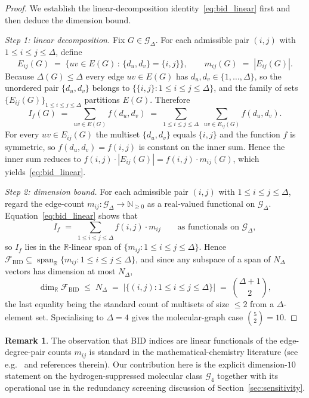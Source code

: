 \documentclass[11pt,a4paper]{article}
\theoremstyle{definition}
\newtheorem{remark}[theorem]{Remark}
\newcommand{\bid}{\mathcal{F}_{\mathrm{BID}}}
\begin{document}
\begin{proof}
We establish the linear-decomposition
identity~\eqref{eq:bid_linear} first and then deduce the dimension
bound.

\emph{Step 1: linear decomposition.} Fix $G\in\mathcal{G}_{\Delta}$.
For each admissible pair $(i,j)$ with $1\le i\le j\le\Delta$, define
\[
E_{ij}(G) \;=\; \bigl\{ uv\in E(G) \,:\, \{d_u,d_v\}=\{i,j\} \bigr\},
\qquad
m_{ij}(G) \;=\; |E_{ij}(G)|.
\]
Because $\Delta(G)\le\Delta$ every edge $uv\in E(G)$ has
$d_u,d_v\in\{1,\ldots,\Delta\}$, so the unordered pair $\{d_u,d_v\}$
belongs to $\{\{i,j\}:1\le i\le j\le\Delta\}$, and the family of sets
$\{E_{ij}(G)\}_{1\le i\le j\le\Delta}$ partitions $E(G)$. Therefore
\[
I_{f}(G) \;=\; \sum_{uv\in E(G)} f(d_u,d_v)
\;=\; \sum_{1\le i\le j\le\Delta}\;\sum_{uv\in E_{ij}(G)} f(d_u,d_v).
\]
For every $uv\in E_{ij}(G)$ the multiset $\{d_u,d_v\}$ equals
$\{i,j\}$ and the function $f$ is symmetric, so $f(d_u,d_v)=f(i,j)$
is constant on the inner sum. Hence the inner sum reduces to
$f(i,j)\cdot |E_{ij}(G)| = f(i,j)\cdot m_{ij}(G)$, which
yields~\eqref{eq:bid_linear}.

\emph{Step 2: dimension bound.} For each admissible pair $(i, j)$
with $1\le i\le j\le\Delta$, regard the edge-count
$m_{ij}:\mathcal{G}_{\Delta}\to\mathbb{N}_{\ge 0}$ as a real-valued
functional on $\mathcal{G}_{\Delta}$. Equation~\eqref{eq:bid_linear}
shows that
\[
I_{f} \;=\; \sum_{1\le i\le j\le\Delta} f(i,j)\cdot m_{ij}
\qquad\text{as functionals on }\mathcal{G}_{\Delta},
\]
so $I_{f}$ lies in the $\mathbb{R}$-linear span of
$\{m_{ij} : 1\le i\le j\le\Delta\}$. Hence
$\bid \subseteq \operatorname{span}_{\mathbb{R}}\{m_{ij}:1\le i\le j\le\Delta\}$,
and since any subspace of a span of $N_{\Delta}$ vectors has
dimension at most $N_{\Delta}$,
\[
\dim_{\mathbb{R}} \bid \;\le\; N_{\Delta}
\;=\; |\{(i,j) : 1\le i\le j\le\Delta\}|
\;=\; \binom{\Delta+1}{2},
\]
the last equality being the standard count of multisets of size
$\le 2$ from a $\Delta$-element set. Specialising to $\Delta = 4$
gives the molecular-graph case $\binom{5}{2}=10$.
\end{proof}

\begin{remark}\label{rem:bid_credit}
The observation that BID indices are linear functionals of the
edge-degree-pair counts $m_{ij}$ is standard in the
mathematical-chemistry literature (see
e.g.~\cite{BorovicaninDasFurtulaGutman2017Zagreb} and references therein). Our
contribution here is the explicit dimension-$10$ statement on the
hydrogen-suppressed molecular class $\mathcal{G}_{4}$ together with
its operational use in the redundancy screening discussion of
Section~\ref{sec:sensitivity}.
\end{remark}
\end{document}
